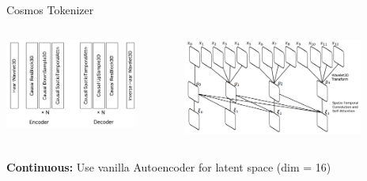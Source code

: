 \documentclass{beamer}
\begin{document}
\begin{frame}[t]{Cosmos Tokenizer}
    \vspace{-2em}
	\begin{columns}[t]
		\begin{column}{.5\textwidth}
            \begin{center}
                \includegraphics[width=0.8\textwidth]{./img/tokenizer_2.png}
            \end{center}
		\end{column}
		\begin{column}{.5\textwidth}
            \begin{center}
                \includegraphics[width=0.8\textwidth]{./img/tokenizer_3.png}
            \end{center}
		\end{column}
	\end{columns}
	\begin{columns}[t]
		\begin{column}{.6\textwidth}
            \newline
            \newline
            \textbf{Continuous:} \newline
            \hspace{+4em}Use vanilla Autoencoder for latent space (dim = 16)\newline

\end{column}
\end{columns}
\end{frame}
\end{document}
